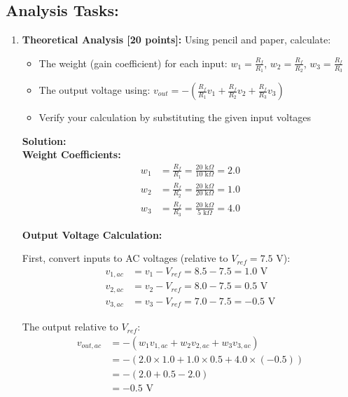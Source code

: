 \documentclass[11pt]{article}
\newenvironment{solution}
    {\color{blue}\textbf{Solution:}\\}
    {}
\begin{document}
\subsection*{Analysis Tasks:}

\begin{enumerate}[label=\textbf{3.\arabic*}]
    \item \textbf{Theoretical Analysis [20 points]:} Using pencil and paper, calculate:
    \begin{itemize}
        \item The weight (gain coefficient) for each input: $w_1 = \frac{R_f}{R_1}$, $w_2 = \frac{R_f}{R_2}$, $w_3 = \frac{R_f}{R_3}$
        \item The output voltage using: $v_{out} = -\left(\frac{R_f}{R_1}v_1 + \frac{R_f}{R_2}v_2 + \frac{R_f}{R_3}v_3\right)$
        \item Verify your calculation by substituting the given input voltages
    \end{itemize}
    
\begin{solution}
\textbf{Weight Coefficients:}
\begin{align*}
w_1 &= \frac{R_f}{R_1} = \frac{20\text{ k}\Omega}{10\text{ k}\Omega} = 2.0\\
w_2 &= \frac{R_f}{R_2} = \frac{20\text{ k}\Omega}{20\text{ k}\Omega} = 1.0\\
w_3 &= \frac{R_f}{R_3} = \frac{20\text{ k}\Omega}{5\text{ k}\Omega} = 4.0
\end{align*}

\textbf{Output Voltage Calculation:}

First, convert inputs to AC voltages (relative to $V_{ref} = 7.5$ V):
\begin{align*}
v_{1,ac} &= v_1 - V_{ref} = 8.5 - 7.5 = 1.0\text{ V}\\
v_{2,ac} &= v_2 - V_{ref} = 8.0 - 7.5 = 0.5\text{ V}\\
v_{3,ac} &= v_3 - V_{ref} = 7.0 - 7.5 = -0.5\text{ V}
\end{align*}

The output relative to $V_{ref}$:
\begin{align*}
v_{out,ac} &= -(w_1 v_{1,ac} + w_2 v_{2,ac} + w_3 v_{3,ac})\\
&= -(2.0 \times 1.0 + 1.0 \times 0.5 + 4.0 \times (-0.5))\\
&= -(2.0 + 0.5 - 2.0)\\
&= -0.5\text{ V}
\end{align*}


\end{solution}
\end{enumerate}
\end{document}
